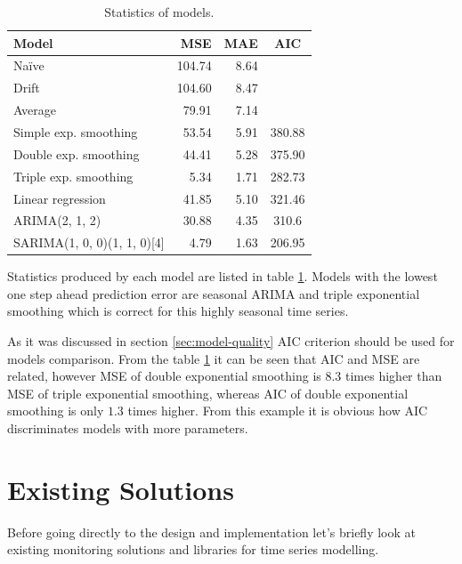     \begin{table}[h]
        \begin{center}
            \begin{tabular}{l|r|r|c}
                    \textbf{Model} & \textbf{MSE} & \textbf{MAE} & \textbf{AIC} \\ \hline \hline
                    Na\"{i}ve & 104.74 & 8.64 & \\
                    Drift & 104.60 & 8.47 & \\
                    Average & 79.91 & 7.14 & \\ \hline
                    Simple exp. smoothing & 53.54 & 5.91 & 380.88 \\
                    Double exp. smoothing & 44.41 & 5.28 & 375.90 \\
                    Triple exp. smoothing & 5.34 & 1.71 & 282.73 \\ \hline
                    Linear regression & 41.85 & 5.10 & 321.46 \\ \hline
                    ARIMA(2, 1, 2) & 30.88 & 4.35 & 310.6 \\
                    SARIMA(1, 0, 0)(1, 1, 0)[4] & 4.79 & 1.63 & 206.95 \\
            \end{tabular}
            \caption{Statistics of models.}
            \label{tab:models-stat}
        \end{center}
    \end{table}

    Statistics produced by each model are listed in table \ref{tab:models-stat}. Models with the lowest one
    step ahead prediction error are seasonal ARIMA and triple exponential smoothing which is correct for this highly
    seasonal time series.

    As it was discussed in section \ref{sec:model-quality} AIC criterion should be used for models comparison. From the
    table \ref{tab:models-stat} it can be seen that AIC and MSE are related, however MSE of double exponential smoothing
    is $8.3$ times higher than MSE of triple exponential smoothing, whereas AIC of double exponential smoothing is
    only $1.3$ times higher. From this example it is obvious how AIC discriminates models with more parameters.

\chapter{Existing Solutions}
Before going directly to the design and implementation let's briefly look at existing monitoring solutions and libraries
for time series modelling.

